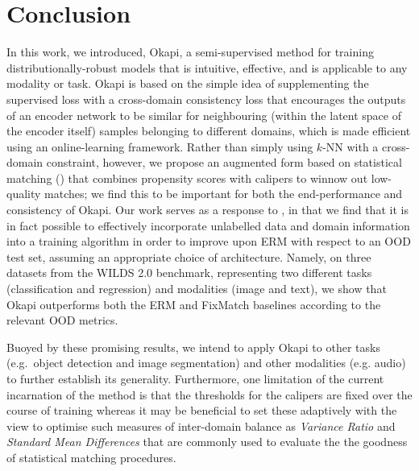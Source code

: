 \section{Conclusion}\label{sec:okapi-conclusion}
In this work, we introduced, Okapi, a semi-supervised method for training distributionally-robust
models that is intuitive, effective, and is applicable to any modality or task.
%
Okapi is based on the simple idea of supplementing the supervised loss with a cross-domain
consistency loss that encourages the outputs of an encoder network to be similar for neighbouring
(within the latent space of the encoder itself) samples  belonging to different domains, which is
made efficient using an online-learning framework.
%
Rather than simply using $k$-NN with a cross-domain constraint, however, we propose an augmented
form based on statistical matching (\CNN) that combines propensity scores with calipers to winnow
out low-quality matches; we find this to be important for both the end-performance and consistency
of Okapi.
%
Our work serves as a response to \cite{SagWeiLeeGaoetal22}, in that we find that it is in fact
possible to effectively incorporate unlabelled data and domain information into a training
algorithm in order to improve upon ERM with respect to an \ac{OOD} test set, assuming an
appropriate choice of architecture.
%
Namely, on three datasets from the WILDS 2.0 benchmark, representing two different tasks
(classification and regression) and modalities (image and text), we show that Okapi outperforms
both the ERM and FixMatch baselines according to the relevant \ac{OOD} metrics.
%

Buoyed by these promising results, we intend to apply Okapi to other tasks (e.g.\ object detection
and image segmentation) and other modalities (e.g. audio) to further establish its generality.
%
Furthermore, one limitation of the current incarnation of the method is that the thresholds for the
calipers are fixed over the course of training whereas it may be beneficial to set these adaptively
with the view to optimise such measures of inter-domain balance as \emph{Variance Ratio} and
\emph{Standard Mean Differences} that are commonly used to evaluate the the goodness of statistical
matching procedures.
